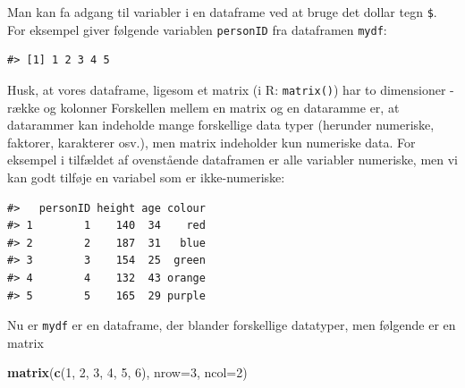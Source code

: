 \documentclass[
]{book}
\newenvironment{Shaded}{\begin{snugshade}}{\end{snugshade}}
\newcommand{\AttributeTok}[1]{\textcolor[rgb]{0.27,0.27,0.27}{#1}}
\newcommand{\CommentTok}[1]{\textcolor[rgb]{0.37,0.37,0.37}{\textit{#1}}}
\newcommand{\DecValTok}[1]{\textcolor[rgb]{0.06,0.06,0.06}{#1}}
\newcommand{\FunctionTok}[1]{\textcolor[rgb]{0.27,0.27,0.27}{\textbf{#1}}}
\newcommand{\NormalTok}[1]{#1}
\newcommand{\OtherTok}[1]{\textcolor[rgb]{0.37,0.37,0.37}{#1}}
\newcommand{\SpecialCharTok}[1]{\textcolor[rgb]{0.43,0.43,0.43}{\textbf{#1}}}
\newcommand{\StringTok}[1]{\textcolor[rgb]{0.5,0.5,0.5}{#1}}
\begin{document}
Man kan fa adgang til variabler i en dataframe ved at bruge det dollar tegn \texttt{\$}. For eksempel giver følgende variablen \texttt{personID} fra dataframen \texttt{mydf}:

\begin{Shaded}
\end{Shaded}

\begin{verbatim}
#> [1] 1 2 3 4 5
\end{verbatim}

Husk, at vores dataframe, ligesom et matrix (i R: \texttt{matrix()}) har to dimensioner - række og kolonner Forskellen mellem en matrix og en dataramme er, at datarammer kan indeholde mange forskellige data typer (herunder numeriske, faktorer, karakterer osv.), men matrix indeholder kun numeriske data. For eksempel i tilfældet af ovenstående dataframen er alle variabler numeriske, men vi kan godt tilføje en variabel som er ikke-numeriske:

\begin{Shaded}
\end{Shaded}

\begin{verbatim}
#>   personID height age colour
#> 1        1    140  34    red
#> 2        2    187  31   blue
#> 3        3    154  25  green
#> 4        4    132  43 orange
#> 5        5    165  29 purple
\end{verbatim}

Nu er \texttt{mydf} er en dataframe, der blander forskellige datatyper, men følgende er en matrix

\begin{Shaded}
\begin{Highlighting}[]
\FunctionTok{matrix}\NormalTok{(}\FunctionTok{c}\NormalTok{(}\DecValTok{1}\NormalTok{, }\DecValTok{2}\NormalTok{, }\DecValTok{3}\NormalTok{, }\DecValTok{4}\NormalTok{, }\DecValTok{5}\NormalTok{, }\DecValTok{6}\NormalTok{), }
    \AttributeTok{nrow=}\DecValTok{3}\NormalTok{,}
    \AttributeTok{ncol=}\DecValTok{2}\NormalTok{)}
\end{Highlighting}
\end{Shaded}
\end{document}
